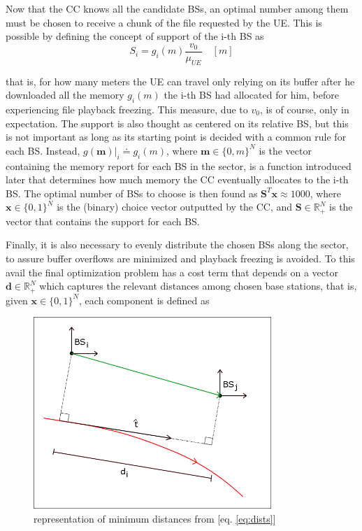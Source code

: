 \documentclass[conference,10pt]{IEEEtran}
\begin{document}
Now that the CC knows all the candidate BSs, an optimal number among them must be chosen to receive a chunk of the file requested by the UE. This is possible by defining the concept of support of the i-th BS as
\begin{equation}
\label{eq:support-region}
S_i = g_i(m)\frac{v_0}{\mu_{U\!E}} \quad [m]
\end{equation}

that is, for how many meters the UE can travel only relying on its buffer after he downloaded all the memory $g_i(m)$ the i-th BS had allocated for him, before experiencing file playback freezing. This measure, due to $v_0$, is of course, only in expectation. The support is also thought as centered on its relative BS, but this is not important as long as its starting point is decided with a common rule for each BS. Instead, $g(\mathbf{m})|_i \doteq g_i(m)$, where $\mathbf{m} \in \{0, m\}^N$ is the vector containing the memory report for each BS in the sector, is a function introduced later that determines how much memory the CC eventually allocates to the i-th BS. The optimal number of BSs to choose is then found as $\mathbf{S}^T\mathbf{x} \approx 1000$, where $\mathbf{x} \in \{0,1\}^N$ is the (binary) choice vector outputted by the CC, and  $\mathbf{S} \in \mathbb{R}_+^N$ is the vector that contains the support for each BS.

Finally, it is also necessary to evenly distribute the chosen BSs along the sector, to assure buffer overflows are minimized and playback freezing is avoided. To this avail the final optimization problem has a cost term that depends on a vector $\mathbf{d} \in \mathbb{R}_+^N$ which captures the relevant distances among chosen base stations, that is, given $\mathbf{x} \in \{0,1\}^N$, each component is defined as

\begin{figure}[t]
	\centering
	\includegraphics[width=9cm]{BS_distance.png}
	\caption{representation of minimum distances from [eq. \ref{eq:dists}] }
	\label{fig:min_dists}
\end{figure}
\end{document}

